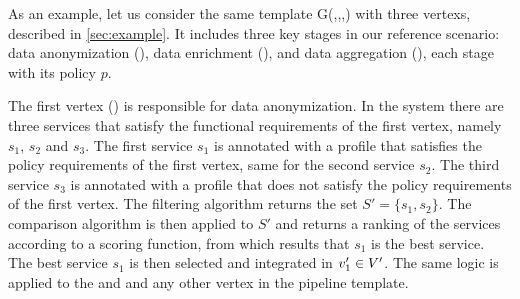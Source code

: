 \begin{example}\label{ex:instance}

  As an example, let us consider the same template G(\V,\E,\myLambda,\myGamma) with three vertexs, described in \cref{sec:example}.
  It includes three key stages in our reference scenario: data anonymization (), data enrichment (), and data aggregation (), each stage with its policy $p$.

  The first vertex () is responsible for data anonymization.
  In the system there are three services that satisfy the functional requirements of the first vertex, namely $s_1$, $s_2$ and $s_3$.
  The first service $s_1$ is annotated with a profile that satisfies the policy requirements of the first vertex, same for the second service $s_2$.
  The third service $s_3$ is annotated with a profile that does not satisfy the policy requirements of the first vertex.
  The filtering algorithm returns the set $S'=\{s_1,s_2\}$.
  The comparison algorithm is then applied to $S'$ and returns a ranking of the services according to a scoring function, from which results that $s_1$ is the best service.
  The best service $s_1$ is then selected and integrated in $v'_{1}\in V'$.
  The same logic is applied to the  and  and any other vertex in the pipeline template.

\end{example}







